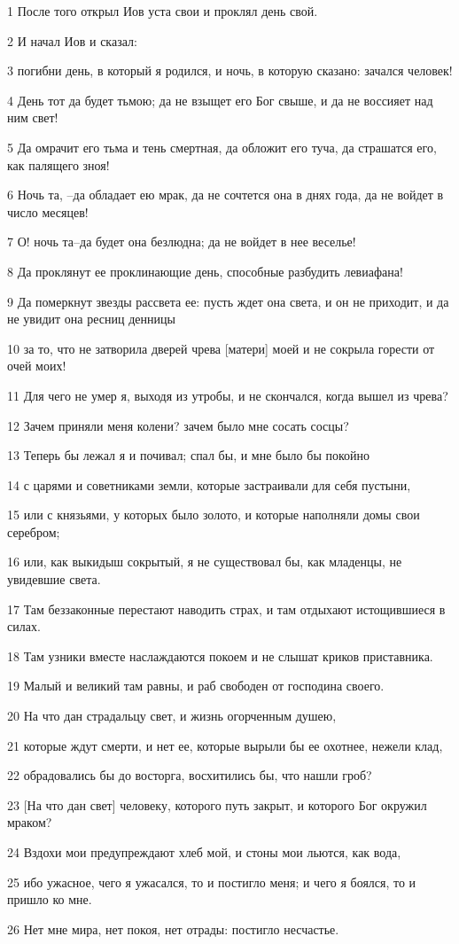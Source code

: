 \par 1 После того открыл Иов уста свои и проклял день свой.
\par 2 И начал Иов и сказал:
\par 3 погибни день, в который я родился, и ночь, в которую сказано: зачался человек!
\par 4 День тот да будет тьмою; да не взыщет его Бог свыше, и да не воссияет над ним свет!
\par 5 Да омрачит его тьма и тень смертная, да обложит его туча, да страшатся его, как палящего зноя!
\par 6 Ночь та, --да обладает ею мрак, да не сочтется она в днях года, да не войдет в число месяцев!
\par 7 О! ночь та--да будет она безлюдна; да не войдет в нее веселье!
\par 8 Да проклянут ее проклинающие день, способные разбудить левиафана!
\par 9 Да померкнут звезды рассвета ее: пусть ждет она света, и он не приходит, и да не увидит она ресниц денницы
\par 10 за то, что не затворила дверей чрева [матери] моей и не сокрыла горести от очей моих!
\par 11 Для чего не умер я, выходя из утробы, и не скончался, когда вышел из чрева?
\par 12 Зачем приняли меня колени? зачем было мне сосать сосцы?
\par 13 Теперь бы лежал я и почивал; спал бы, и мне было бы покойно
\par 14 с царями и советниками земли, которые застраивали для себя пустыни,
\par 15 или с князьями, у которых было золото, и которые наполняли домы свои серебром;
\par 16 или, как выкидыш сокрытый, я не существовал бы, как младенцы, не увидевшие света.
\par 17 Там беззаконные перестают наводить страх, и там отдыхают истощившиеся в силах.
\par 18 Там узники вместе наслаждаются покоем и не слышат криков приставника.
\par 19 Малый и великий там равны, и раб свободен от господина своего.
\par 20 На что дан страдальцу свет, и жизнь огорченным душею,
\par 21 которые ждут смерти, и нет ее, которые вырыли бы ее охотнее, нежели клад,
\par 22 обрадовались бы до восторга, восхитились бы, что нашли гроб?
\par 23 [На что дан свет] человеку, которого путь закрыт, и которого Бог окружил мраком?
\par 24 Вздохи мои предупреждают хлеб мой, и стоны мои льются, как вода,
\par 25 ибо ужасное, чего я ужасался, то и постигло меня; и чего я боялся, то и пришло ко мне.
\par 26 Нет мне мира, нет покоя, нет отрады: постигло несчастье.

